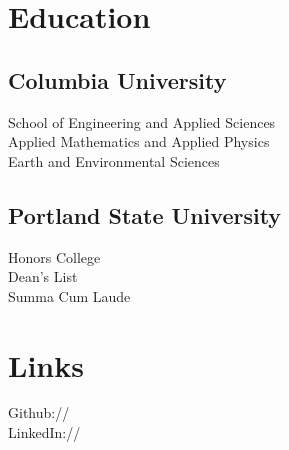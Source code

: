 \documentclass[]{deedy-resume-openfont}
\begin{document}
%
%
\lastupdated

%
%



%
%

\begin{minipage}[t]{0.33\textwidth} 


\section{Education} 
    \subsection{Columbia University}
        School of Engineering and Applied Sciences\\
        Applied Mathematics and Applied Physics\\
        Earth and Environmental Sciences\\
    \sectionsep
    \subsection{Portland State University}
        Honors College \\
        Dean's List \\
        Summa Cum Laude
    \sectionsep
\sectionsep


\section{Links} 
Github:// \href{https://github.com/kaipak}{} \\
LinkedIn://  \href{https://www.linkedin.com/in/kaipak}{} \\
\sectionsep


\end{minipage}
\end{document}

